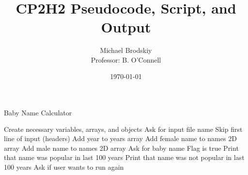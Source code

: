 


\title{CP2H2 Pseudocode, Script, and Output}
\date{\today}
\author{Michael Brodskiy\\ \small Professor: B. O'Connell}



\maketitle

    \begin{algorithm}
      \caption{Baby Name Calculator}\label{1}
      \begin{algorithmic}[1]
        \State Create necessary variables, arrays, and objects
        \State Ask for input file name
        \State Skip first line of input (headers)
                    \State Add year to years array
                    \State Add female name to names 2D array
                \Else
                    \State Add male name to names 2D array
                \EndIf
            \EndFor
        \EndFor
            \State Ask for baby name
                \State Flag is true
            \EndIf
                \State Print that name was popular in last 100 years
            \Else
                \State Print that name was not popular in last 100 years
            \EndIf
            \State Ask if user wants to run again
      \end{algorithmic}
    \end{algorithm}



